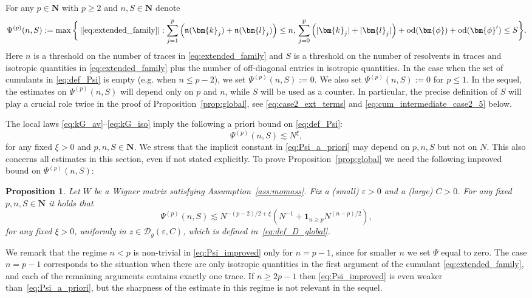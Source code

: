 \documentclass[10pt]{amsart}
\newtheorem{proposition}[theorem]{Proposition}
\numberwithin{equation}{section}
\newcommand{\N}{\mathbf{N}}
\begin{document}
For any $p\in\N$ with $p\ge 2$ and $n,S\in\N$ denote
\begin{equation}
\Psi^{(p)}(n,S):=\max\bigg\lbrace \left\vert \eqref{eq:extended_family}\right\vert : \sum_{j=1}^p \left(\mathfrak{n}(\bm{k}_j)+\mathfrak{n}(\bm{l}_j)\right) \le n,\, \sum_{j=0}^p \left(|\bm{k}_j|+|\bm{l}_j|\right)+\mathrm{od}(\bm{\phi})+\mathrm{od}(\bm{\phi}')\le S\bigg\rbrace.
\label{eq:def_Psi}
\end{equation}
Here $n$ is a threshold on the number of traces in \eqref{eq:extended_family} and $S$ is a threshold on the number of resolvents in traces and isotropic quantities in  \eqref{eq:extended_family} plus the number of off-diagonal entries in isotropic quantities. In the case when the set of cumulants in \eqref{eq:def_Psi} is empty (e.g. when $n\le p-2$), we set $\Psi^{(p)}(n,S):=0$. We also set $\Psi^{(p)}(n,S):=0$ for $p\le 1$. In the sequel, the estimates on $\Psi^{(p)}(n,S)$ will depend only on $p$ and $n$, while $S$ will be used as a counter. In particular, the precise definition  of  $S$ will play a crucial role twice in the proof of Proposition~\ref{prop:global}, see \eqref{eq:case2_ext_terms} and \eqref{eq:cum_intermediate_case2_5} below.

The local laws \eqref{eq:kG_av}--\eqref{eq:kG_iso} imply the following a priori bound on \eqref{eq:def_Psi}:
\begin{equation}
\Psi^{(p)}(n,S)\lesssim N^\xi,
\label{eq:Psi_a_priori}
\end{equation}
for any fixed $\xi>0$ and $p,n,S\in\N$. We stress that the implicit constant in \eqref{eq:Psi_a_priori} may depend on $p,n,S$ but not on $N$. This also concerns all estimates in this section, even if  not stated explicitly. To prove Proposition~\ref{prop:global} we need the following improved bound on $\Psi^{(p)}(n,S)$:

\begin{proposition}\label{prop:global_Psi} Let $W$ be a Wigner matrix satisfying Assumption~\ref{ass:momass}. Fix a (small) $\varepsilon>0$ and a (large) $C>0$. For any fixed $p,n,S\in\N$ it holds that 
\begin{equation}
\Psi^{(p)}(n,S) \lesssim  N^{-(p-2)/2+\xi} \left( N^{-1} + \bm{1}_{n\ge p} N^{(n-p)/2}\right),
\label{eq:Psi_improved}
\end{equation}
for any fixed $\xi>0$, uniformly in $z\in\mathcal{D}_g(\varepsilon,C)$, which is defined in~\eqref{eq:def_D_global}.
\end{proposition}
We remark that the regime $n<p$ is non-trivial in \eqref{eq:Psi_improved} only for $n=p-1$, since for smaller $n$ we set $\Psi$ equal to zero. The case $n=p-1$ corresponds to the situation when there are only isotropic quantities in the first argument of the cumulant \eqref{eq:extended_family}, and each of the remaining arguments contains exactly one trace. If $n\ge 2p-1$ then \eqref{eq:Psi_improved} is even weaker than~\eqref{eq:Psi_a_priori}, but the sharpness of the estimate in this regime is not relevant in the sequel.
\end{document}
